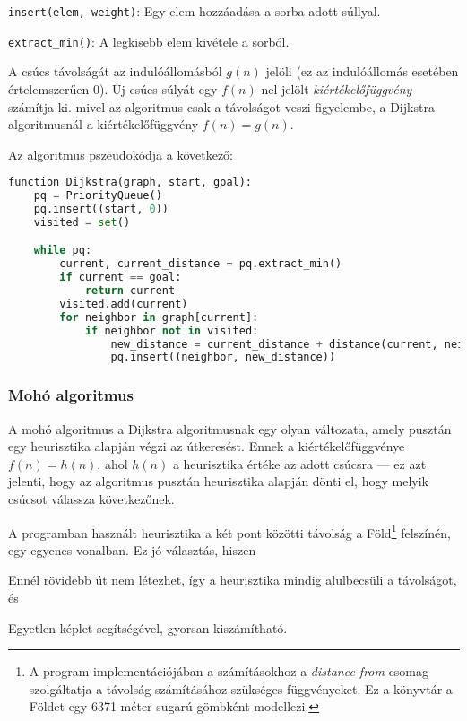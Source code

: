 \begin{compactitem}
    \item \texttt{insert(elem, weight)}: Egy elem hozzáadása a sorba adott súllyal.
    \item \texttt{extract\_min()}: A legkisebb elem kivétele a sorból.
\end{compactitem}

A csúcs távolságát az indulóállomásból $g(n)$ jelöli (ez az indulóállomás esetében értelemszerűen $0$). Új csúcs súlyát egy $f(n)$-nel jelölt \textit{kiértékelőfüggvény} számítja ki. mivel az algoritmus csak a távolságot veszi figyelembe, a Dijkstra algoritmusnál a kiértékelőfüggvény $f(n) = g(n)$.

Az algoritmus pszeudokódja a következő: \\

\begin{minipage}{\textwidth}
\begin{lstlisting}[language={Python}]
function Dijkstra(graph, start, goal):
    pq = PriorityQueue()
    pq.insert((start, 0))
    visited = set()

    while pq:
        current, current_distance = pq.extract_min()
        if current == goal:
            return current
        visited.add(current)
        for neighbor in graph[current]:
            if neighbor not in visited:
                new_distance = current_distance + distance(current, neighbor)
                pq.insert((neighbor, new_distance))
\end{lstlisting}
\end{minipage}

\subsubsection{Mohó algoritmus}

A mohó algoritmus a Dijkstra algoritmusnak egy olyan változata, amely pusztán egy heurisztika alapján végzi az útkeresést\cite{russell2020artificial}. Ennek a kiértékelőfüggvénye $f(n) = h(n)$, ahol $h(n)$ a heurisztika értéke az adott csúcsra --- ez azt jelenti, hogy az algoritmus pusztán heurisztika alapján dönti el, hogy melyik csúcsot válassza következőnek.

A programban használt heurisztika a két pont közötti távolság a Föld\footnote{A program implementációjában a számításokhoz a \textit{distance-from} csomag szolgáltatja a távolság számításához szükséges függvényeket. Ez a könyvtár a Földet egy 6371 méter sugarú gömbként modellezi\cite{distancefrom-github}.} felszínén, egy egyenes vonalban. Ez jó választás\cite{russell2020artificial}, hiszen
\begin{compactenum}
    \item Ennél rövidebb út nem létezhet, így a heurisztika mindig alulbecsüli a távolságot, és
    \item Egyetlen képlet segítségével, gyorsan kiszámítható.
\end{compactenum}

